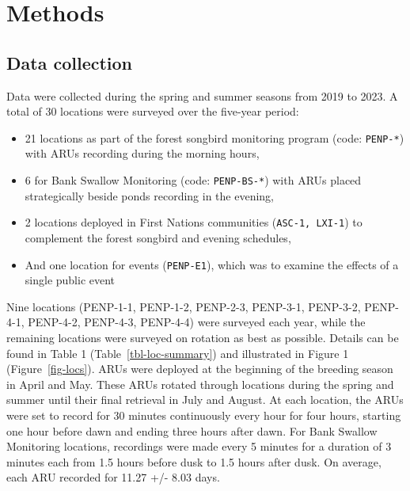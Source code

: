 \documentclass[
  letterpaper,
  DIV=11,
  numbers=noendperiod,
  oneside]{scrartcl}
\providecommand{\tightlist}{%
  \setlength{\itemsep}{0pt}\setlength{\parskip}{0pt}}\usepackage{longtable,booktabs,array}
\begin{document}
\hypertarget{methods}{%
\section{Methods}\label{methods}}

\hypertarget{data-collection}{%
\subsection{Data collection}\label{data-collection}}

Data were collected during the spring and summer seasons from 2019 to
2023. A total of 30 locations were surveyed over the five-year period:

\begin{itemize}
\tightlist
\item
  21 locations as part of the forest songbird monitoring program (code:
  \texttt{PENP-*}) with ARUs recording during the morning hours,
\item
  6 for Bank Swallow Monitoring (code: \texttt{PENP-BS-*}) with ARUs
  placed strategically beside ponds recording in the evening,
\item
  2 locations deployed in First Nations communities
  (\texttt{ASC-1,\ LXI-1}) to complement the forest songbird and evening
  schedules,
\item
  And one location for events (\texttt{PENP-E1}), which was to examine
  the effects of a single public event
\end{itemize}

Nine locations (PENP-1-1, PENP-1-2, PENP-2-3, PENP-3-1, PENP-3-2,
PENP-4-1, PENP-4-2, PENP-4-3, PENP-4-4) were surveyed each year, while
the remaining locations were surveyed on rotation as best as possible.
Details can be found in Table 1 (Table~\ref{tbl-loc-summary}) and
illustrated in Figure 1 (Figure~\ref{fig-locs}). ARUs were deployed at
the beginning of the breeding season in April and May. These ARUs
rotated through locations during the spring and summer until their final
retrieval in July and August. At each location, the ARUs were set to
record for 30 minutes continuously every hour for four hours, starting
one hour before dawn and ending three hours after dawn. For Bank Swallow
Monitoring locations, recordings were made every 5 minutes for a
duration of 3 minutes each from 1.5 hours before dusk to 1.5 hours after
dusk. On average, each ARU recorded for 11.27 +/- 8.03 days.
\end{document}
